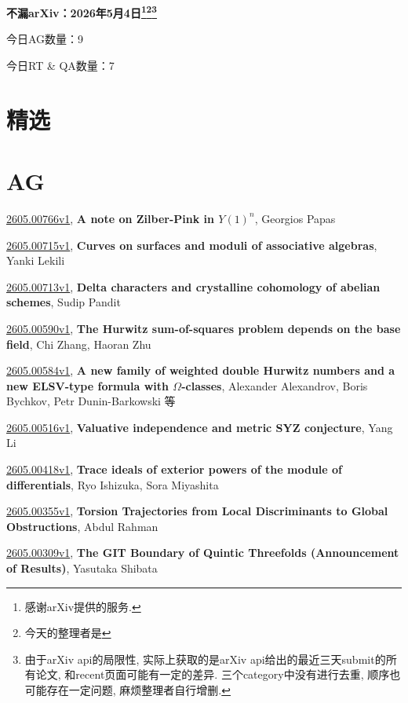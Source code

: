 \documentclass[9pt, a4paper]{article}
\theoremstyle{plain}
\theoremstyle{definition}
\theoremstyle{remark}
\newcommand{\arxiv}[3]{\href{https://arxiv.org/abs/#1}{#1}, \textbf{\textcolor{arxivblue}{#2}}, #3}
\newcommand{\AGnumber}{9}
\newcommand{\RTQAnumber}{7}
\newcommand{\NewestDate}{2026年5月4日}
\newcommand{\todayarXiver}{} %
\begin{document}
\begin{center}
    \Huge\textbf{不漏arXiv：\NewestDate\footnote{感谢arXiv提供的服务.}\footnote{今天的整理者是\todayarXiver}\footnote{由于arXiv api的局限性, 实际上获取的是arXiv api给出的最近三天submit的所有论文, 和recent页面可能有一定的差异. 三个category中没有进行去重, 顺序也可能存在一定问题, 麻烦整理者自行增删.}} \\
\end{center}

\setcounter{section}{-1}

\begin{center}
    今日AG数量：\AGnumber
    
    今日RT \& QA数量：\RTQAnumber
    
\end{center}


\section{精选}


\section{AG}
\arxiv{2605.00766v1}{A note on Zilber-Pink in $Y(1)^n$}{Georgios Papas}

\arxiv{2605.00715v1}{Curves on surfaces and moduli of associative algebras}{Yanki Lekili}

\arxiv{2605.00713v1}{Delta characters and crystalline cohomology of abelian schemes}{Sudip Pandit}

\arxiv{2605.00590v1}{The Hurwitz sum-of-squares problem depends on the base field}{Chi Zhang, Haoran Zhu}

\arxiv{2605.00584v1}{A new family of weighted double Hurwitz numbers and a new ELSV-type formula with $Ω$-classes}{Alexander Alexandrov, Boris Bychkov, Petr Dunin-Barkowski 等}

\arxiv{2605.00516v1}{Valuative independence and metric SYZ conjecture}{Yang Li}

\arxiv{2605.00418v1}{Trace ideals of exterior powers of the module of differentials}{Ryo Ishizuka, Sora Miyashita}

\arxiv{2605.00355v1}{Torsion Trajectories from Local Discriminants to Global Obstructions}{Abdul Rahman}

\arxiv{2605.00309v1}{The GIT Boundary of Quintic Threefolds (Announcement of Results)}{Yasutaka Shibata}

\end{document}
